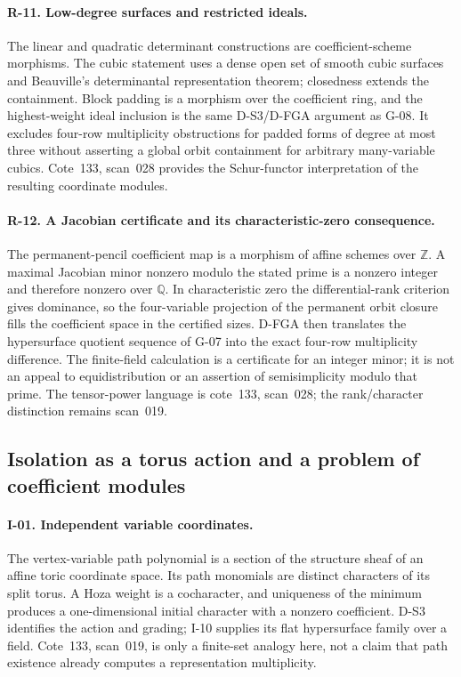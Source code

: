 \documentclass[11pt,a4paper]{article}
\theoremstyle{definition}\newtheorem{definition}{Definition}
\begin{document}
\paragraph{R-11. Low-degree surfaces and restricted ideals.}
The linear and quadratic determinant constructions are coefficient-scheme morphisms. The cubic statement uses a dense open set of smooth cubic surfaces and Beauville's determinantal representation theorem; closedness extends the containment. Block padding is a morphism over the coefficient ring, and the highest-weight ideal inclusion is the same D-S3/D-FGA argument as G-08. It excludes four-row multiplicity obstructions for padded forms of degree at most three without asserting a global orbit containment for arbitrary many-variable cubics. Cote~133, scan~028 provides the Schur-functor interpretation of the resulting coordinate modules.

\paragraph{R-12. A Jacobian certificate and its characteristic-zero consequence.}
The permanent-pencil coefficient map is a morphism of affine schemes over $\mathbb Z$. A maximal Jacobian minor nonzero modulo the stated prime is a nonzero integer and therefore nonzero over $\mathbb Q$. In characteristic zero the differential-rank criterion gives dominance, so the four-variable projection of the permanent orbit closure fills the coefficient space in the certified sizes. D-FGA then translates the hypersurface quotient sequence of G-07 into the exact four-row multiplicity difference. The finite-field calculation is a certificate for an integer minor; it is not an appeal to equidistribution or an assertion of semisimplicity modulo that prime. The tensor-power language is cote~133, scan~028; the rank/character distinction remains scan~019.

\subsection{Isolation as a torus action and a problem of coefficient modules}

\paragraph{I-01. Independent variable coordinates.}
The vertex-variable path polynomial is a section of the structure sheaf of an affine toric coordinate space. Its path monomials are distinct characters of its split torus. A Hoza weight is a cocharacter, and uniqueness of the minimum produces a one-dimensional initial character with a nonzero coefficient. D-S3 identifies the action and grading; I-10 supplies its flat hypersurface family over a field. Cote~133, scan~019, is only a finite-set analogy here, not a claim that path existence already computes a representation multiplicity.
\end{document}

